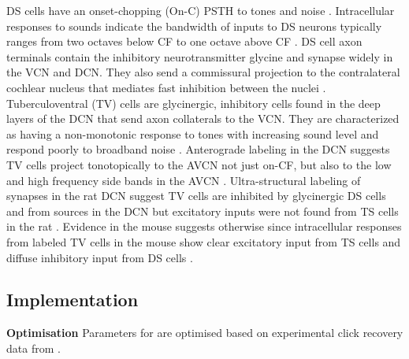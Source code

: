 DS cells have an onset-chopping (On-C) PSTH to tones and noise
\citep{SmithRhode:1989,NeedhamPaolini:2006}. Intracellular responses to sounds
indicate the bandwidth of inputs to DS neurons typically ranges from two
octaves below CF to one octave above CF
\citep{PalmerJiangEtAl:1996,PaoliniClark:1999}. DS cell axon terminals contain
the inhibitory neurotransmitter glycine and synapse widely in the VCN and DCN.
They also send a commissural projection to the contralateral cochlear nucleus
that mediates fast inhibition between the nuclei
\citep{NeedhamPaolini:2003,NeedhamPaolini:2006}. Tuberculoventral  (TV) cells
are glycinergic, inhibitory cells found in the deep layers of the DCN that send
axon collaterals to the VCN. They are characterized as having a non-monotonic
response to tones with increasing sound level and respond poorly to broadband
noise \citep{SpirouDavisEtAl:1999,NelkenYoung:1997,ReissYoung:2005}.
Anterograde labeling in the DCN suggests TV cells project tonotopically to the
AVCN not just on-CF, but also to the low and high frequency side bands in the
AVCN \citep{MunirathinamOstapoffEtAl:2004,OstapoffMorestEtAl:1999}.
Ultra-structural labeling of synapses in the rat DCN suggest TV cells are
inhibited by glycinergic DS cells and from sources in the DCN but excitatory
inputs were not found from TS cells in the rat \citep{Rubio:2005}. Evidence in
the mouse suggests otherwise since intracellular responses from labeled TV
cells in the mouse show clear excitatory input from TS cells and diffuse
inhibitory input from DS cells
\citep{ZhangOertel:1993b,WickesbergOertel:1993}.



\subsection{Implementation}
\textbf{Optimisation}    
 Parameters for \GLGDS are optimised based on experimental click recovery data from \citep{BackoffPalombiEtAl:1997}.

